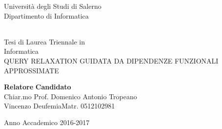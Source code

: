 \begin{center}
{\Large Università degli Studi di Salerno}\\[0.2truecm]
{\large Dipartimento di Informatica}\\
\hrulefill
\vfill
{}\\[0.2truecm]
\vfill

{\large Tesi di Laurea Triennale in }\\[0.2truecm]
{\Large Informatica}\\
\vfill\vfill
{\large QUERY RELAXATION GUIDATA DA DIPENDENZE FUNZIONALI APPROSSIMATE}
\vfill\vfill


 {\bf Relatore} \hfill {\bf Candidato}\ \ \\
Chiar.mo Prof. \hfill Domenico Antonio Tropeano \\
Vincenzo Deufemia\hfill Matr. 0512102981
\vfill
\hrulefill 

Anno Accademico 2016-2017

\end{center}

